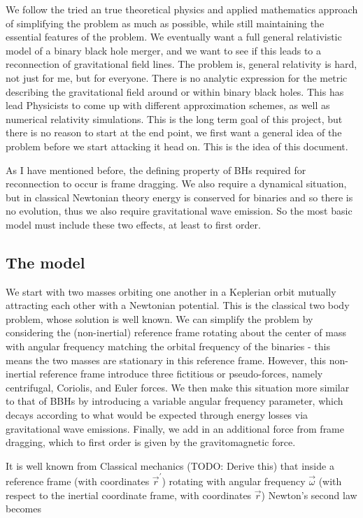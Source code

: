 \documentclass{article}
\begin{document}
We follow the tried an true theoretical physics and applied mathematics approach of simplifying the problem as much as possible, while still maintaining the essential features of the problem. We eventually want a full general relativistic model of a binary black hole merger, and we want to see if this leads to a reconnection of gravitational field lines. The problem is, general relativity is hard, not just for me, but for everyone. There is no analytic expression for the metric describing the gravitational field around or within binary black holes. This has lead Physicists to come up with different approximation schemes, as well as numerical relativity simulations. This is the long term goal of this project, but there is no reason to start at the end point, we first want a general idea of the problem before we start attacking it head on. This is the idea of this document.

As I have mentioned before, the defining property of BHs required for reconnection to occur is frame dragging. We also require a dynamical situation, but in classical Newtonian theory energy is conserved for binaries and so there is no evolution, thus we also require gravitational wave emission. So the most basic model must include these two effects, at least to first order.

\subsection{The model}

We start with two masses orbiting one another in a Keplerian orbit mutually attracting each other with a Newtonian potential. This is the classical two body problem, whose solution is well known. We can simplify the problem by considering the (non-inertial) reference frame rotating about the center of mass with angular frequency matching the orbital frequency of the binaries - this means the two masses are stationary in this reference frame. However, this non-inertial reference frame introduce three fictitious or pseudo-forces, namely centrifugal, Coriolis, and Euler forces. We then make this situation more similar to that of BBHs by introducing a variable angular frequency parameter, which decays according to what would be expected through energy losses via gravitational wave emissions. Finally, we add in an additional force from frame dragging, which to first order is given by the gravitomagnetic force.

It is well known from Classical mechanics (TODO: Derive this) that inside a reference frame (with coordinates $\vec{r}^{\prime}$) rotating with angular frequency $\vec{\omega}$ (with respect to the inertial coordinate frame, with coordinates $\vec{r}$) Newton's second law becomes
\end{document}
